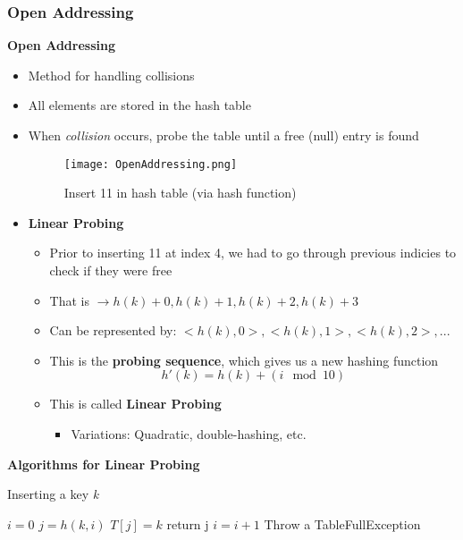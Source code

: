 \documentclass[10pt, 
a4paper, 
oneside, 
headinclude, footinclude, 
BCOR5mm]
{scrartcl}
\begin{document}
\subsubsection{Open Addressing}
\begin{definition}
    \textbf{Open Addressing}
    \begin{itemize}
        \item Method for handling collisions
        \item All elements are stored in the hash table
        \item When \textit{collision} occurs, probe the table until a free (null) entry is found
        \begin{figure}[H]
            \begin{center}
                \texttt{[image: OpenAddressing.png]}
                \caption{Insert 11 in hash table (via hash function)}
            \end{center}
        \end{figure}
        \item \textbf{Linear Probing}
        \begin{itemize}
            \item Prior to inserting 11 at index 4, we had to go through previous indicies to check if they were free
            \item That is $\rightarrow h(k)+0, h(k)+1, h(k)+2, h(k)+3$
            \item Can be represented by: $<h(k),0>,<h(k),1>,<h(k),2>,...$
            \item This is the \textbf{probing sequence}, which gives us a new hashing function $$h'(k)=h(k)+(i \mod 10)$$
            \item This is called \textbf{Linear Probing}
            \begin{itemize}
                \item Variations: Quadratic, double-hashing, etc.
            \end{itemize} 
        \end{itemize}
    \end{itemize}
\end{definition}
\textbf{Algorithms for Linear Probing}
\begin{algorithm}
    \caption{Inserting a key \textit{k}}
    $i = 0$\;
        {$j=h(k,i)$\;
            {$T[j]=k$\;
            return j\;}
        $i=i+1$\;}
    Throw a TableFullException\;
\end{algorithm}
\end{document}
